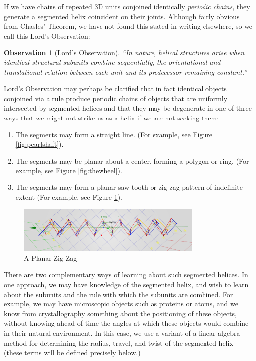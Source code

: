 \documentclass[11pt]{article}
\newtheorem{observation}{Observation}
\begin{document}
{If we have chains of repeated 3D units conjoined identically {\em periodic chains},
they generate a segmented helix coincident on their joints.
Although fairly obvious from Chasles' Theorem, we have not found this stated in writing elsewhere, so we call this Lord's Observation:

\begin{observation}[Lord's Observation]
  “In nature, helical structures arise when identical structural subunits combine sequentially, the orientational and translational relation between each unit and its predecessor remaining constant.”\cite{lord2002helical}
\end{observation}
Lord's Observation may perhaps be clarified that in fact identical objects conjoined via a rule
produce periodic chains of objects that are uniformly intersected by segmented helices and that they may be degenerate in one of
three ways that we might not strike us as a helix if we are not seeking them:
\begin{enumerate}
\item The segments may form a straight line. (For example, see Figure \ref{fig:pearlshaft}).
\item The segments may be planar about a center, forming a polygon or ring. (For example, see Figure \ref{fig:thewheel}).
\item The segments may form a planar saw-tooth or zig-zag pattern of indefinite extent (For example, see Figure \ref{fig:planarzigzag}).
\end{enumerate}

\begin{figure}
     \centering
     \includegraphics[width=0.80\textwidth]{figures/PlanarZigZag.png}
     \caption{A Planar Zig-Zag}
  \label{fig:planarzigzag}
\end{figure}

There are two complementary ways of learning about such segmented helices.
In one approach, we may have knowledge of the segmented helix, and
wish to learn about the subunits and the rule with which the subunits are combined.
For example, we may have microscopic objects such as proteins
or atoms, and we know from crystallography something about the positioning of these objects, without
knowing ahead of time the angles at which these objects would combine in their natural environment.
In this case, we use a variant of a linear algebra method\cite{kahn1989defining} for determining the radius, travel, and twist
of the segmented helix (these terms will be defined precisely below.)

}
\end{document}
